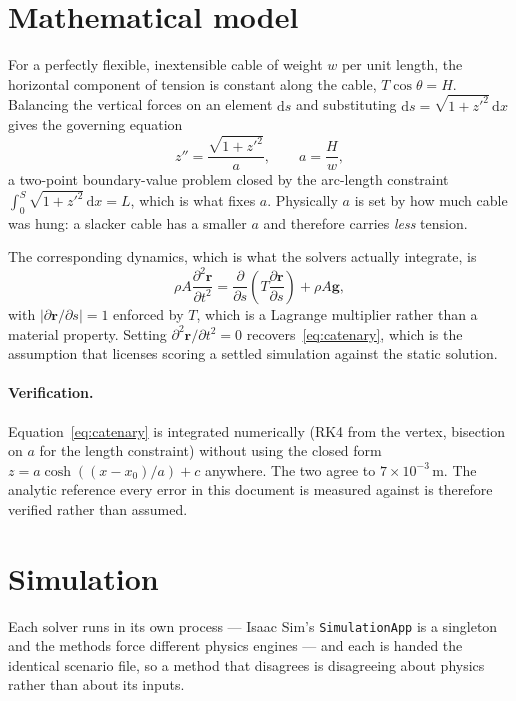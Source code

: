 \documentclass[11pt,a4paper]{article}
\begin{document}
\section{Mathematical model}

For a perfectly flexible, inextensible cable of weight $w$ per unit length, the
horizontal component of tension is constant along the cable, $T\cos\theta = H$.
Balancing the vertical forces on an element $\mathrm{d}s$ and substituting
$\mathrm{d}s = \sqrt{1 + z'^2}\,\mathrm{d}x$ gives the governing equation
\begin{equation}
  z'' = \frac{\sqrt{1 + z'^2}}{a}, \qquad a = \frac{H}{w},
  \label{eq:catenary}
\end{equation}
a two-point boundary-value problem closed by the arc-length constraint
$\int_0^S \sqrt{1 + z'^2}\,\mathrm{d}x = L$, which is what fixes $a$.
Physically $a$ is set by how much cable was hung: a slacker cable has a smaller
$a$ and therefore carries \emph{less} tension.

The corresponding dynamics, which is what the solvers actually integrate, is
\begin{equation}
  \rho A \frac{\partial^2 \mathbf{r}}{\partial t^2}
    = \frac{\partial}{\partial s}\!\left( T \frac{\partial \mathbf{r}}{\partial s} \right)
      + \rho A \mathbf{g},
  \label{eq:dynamics}
\end{equation}
with $|\partial \mathbf{r} / \partial s| = 1$ enforced by $T$, which is a
Lagrange multiplier rather than a material property. Setting
$\partial^2\mathbf{r}/\partial t^2 = 0$ recovers~\eqref{eq:catenary}, which
is the assumption that licenses scoring a settled simulation against the static
solution.

\paragraph{Verification.} Equation~\eqref{eq:catenary} is integrated
numerically (RK4 from the vertex, bisection on $a$ for the length constraint)
without using the closed form $z = a\cosh((x-x_0)/a) + c$ anywhere. The two
agree to $7\times10^{-3}$\,\textmu m. The analytic reference every error in
this document is measured against is therefore verified rather than assumed.

\section{Simulation}

Each solver runs in its own process --- Isaac Sim's \texttt{SimulationApp} is
a singleton and the methods force different physics engines --- and each is
handed the identical scenario file, so a method that disagrees is disagreeing
about physics rather than about its inputs.
\end{document}
